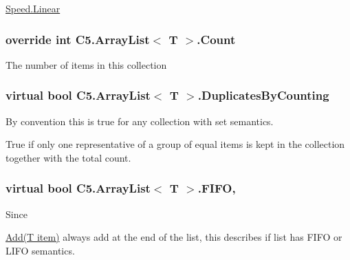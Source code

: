 \hyperlink{namespace_c5_a615ba88dcdaa8d5a3c5f833a73d7fad6a32a843da6ea40ab3b17a3421ccdf671b}{Speed.\+Linear}\hypertarget{class_c5_1_1_array_list_aee0f5d70dbc5ce43dfe5ca71f17e5913}{}
\subsubsection[{Count}]{\setlength{\rightskip}{0pt plus 5cm}override int {\bf C5.\+Array\+List}$<$ T $>$.Count\hspace{0.3cm}{\ttfamily [get]}}\label{class_c5_1_1_array_list_aee0f5d70dbc5ce43dfe5ca71f17e5913}




The number of items in this collection\hypertarget{class_c5_1_1_array_list_a7aabcc197b80abbccc4b39497816ec4f}{}
\subsubsection[{Duplicates\+By\+Counting}]{\setlength{\rightskip}{0pt plus 5cm}virtual bool {\bf C5.\+Array\+List}$<$ T $>$.Duplicates\+By\+Counting\hspace{0.3cm}{\ttfamily [get]}}\label{class_c5_1_1_array_list_a7aabcc197b80abbccc4b39497816ec4f}


By convention this is true for any collection with set semantics. 

True if only one representative of a group of equal items is kept in the collection together with the total count.\hypertarget{class_c5_1_1_array_list_afe367da5aabd34c3c4af20648deaf6a6}{}
\subsubsection[{F\+I\+F\+O}]{\setlength{\rightskip}{0pt plus 5cm}virtual bool {\bf C5.\+Array\+List}$<$ T $>$.F\+I\+F\+O\hspace{0.3cm}{\ttfamily [get]}, {\ttfamily [set]}}\label{class_c5_1_1_array_list_afe367da5aabd34c3c4af20648deaf6a6}


Since 

{\ttfamily \hyperlink{class_c5_1_1_array_list_a31f07a779aa64ee15f6875ab74682cb5}{Add(\+T item)}} always add at the end of the list, this describes if list has F\+I\+F\+O or L\+I\+F\+O semantics. 

